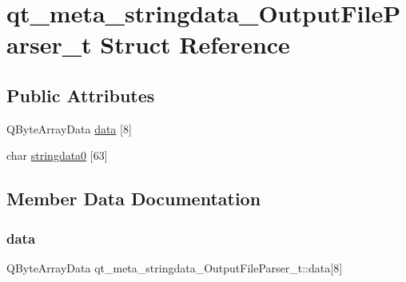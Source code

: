 \hypertarget{structqt__meta__stringdata___output_file_parser__t}{}\section{qt\+\_\+meta\+\_\+stringdata\+\_\+\+Output\+File\+Parser\+\_\+t Struct Reference}
\label{structqt__meta__stringdata___output_file_parser__t}
\subsection*{Public Attributes}
\begin{DoxyCompactItemize}
\item 
Q\+Byte\+Array\+Data \mbox{\hyperlink{structqt__meta__stringdata___output_file_parser__t_a4b81877354e5678680c3b3dff5c2c9f9}{data}} \mbox{[}8\mbox{]}
\item 
char \mbox{\hyperlink{structqt__meta__stringdata___output_file_parser__t_aa4359c1e4da64bceabcdbee8547ad2cc}{stringdata0}} \mbox{[}63\mbox{]}
\end{DoxyCompactItemize}


\subsection{Member Data Documentation}
\mbox{\label{structqt__meta__stringdata___output_file_parser__t_a4b81877354e5678680c3b3dff5c2c9f9}} 
\subsubsection{\texorpdfstring{data}{data}}
{\footnotesize\ttfamily Q\+Byte\+Array\+Data qt\+\_\+meta\+\_\+stringdata\+\_\+\+Output\+File\+Parser\+\_\+t\+::data\mbox{[}8\mbox{]}}

\mbox{\label{structqt__meta__stringdata___output_file_parser__t_aa4359c1e4da64bceabcdbee8547ad2cc}} 

